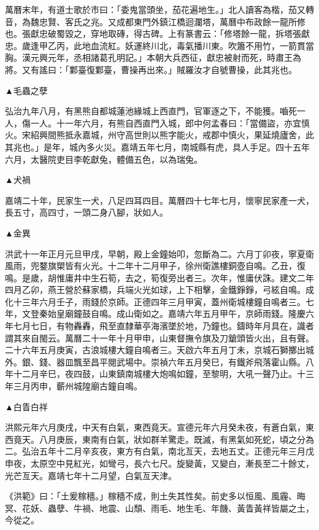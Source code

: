\begin{pinyinscope}
萬曆末年，有道士歌於市曰：「委鬼當頭坐，茄花遍地生。」北人讀客為楷，茄又轉音，為魏忠賢、客氏之兆。又成都東門外鎮江橋迴瀾塔，萬曆中布政餘一龍所修也。張獻忠破蜀毀之，穿地取磚，得古碑。上有篆書云：「修塔餘一龍，拆塔張獻忠。歲逢甲乙丙，此地血流紅。妖運終川北，毒氣播川東。吹簫不用竹，一箭貫當胸。漢元興元年，丞相諸葛孔明記。」本朝大兵西征，獻忠被射而死，時肅王為將。又有謠曰：「鄴臺復鄴臺，曹操再出來。」賊羅汝才自號曹操，此其兆也。

▲毛蟲之孽

弘治九年八月，有黑熊自都城蓮池緣城上西直門，官軍逐之下，不能獲。嚙死一人，傷一人。十一年六月，有熊自西直門入城，郎中何孟春曰：「當備盜，亦宜慎火。宋紹興間熊抵永嘉城，州守高世則以熊字能火，戒郡中慎火，果延燒廬舍，此其兆也。」是年，城內多火災。嘉靖五年七月，南城縣有虎，具人手足。四十五年六月，太醫院吏目李乾獻兔，體備五色，以為瑞兔。

▲犬禍

嘉靖二十年，民家生一犬，八足四耳四目。萬曆四十七年七月，懷寧民家產一犬，長五寸，高四寸，一頭二身八腳，狀如人。

▲金異

洪武十一年正月元旦甲戌，早朝，殿上金鐘始叩，忽斷為二。六月丁卯夜，寧夏衛風雨，兜鍪旗槊皆有火光。十二年十二月甲子，徐州衛譙樓銅壺自鳴。乙丑，復鳴。是歲，胡惟庸井中生石筍，去之，筍復旁出者三。次年，惟庸伏誅。建文二年四月乙卯，燕王營於蘇家橋，兵端火光如球，上下相擊，金鐵錚錚，弓絃自鳴。成化十三年六月壬子，雨錢於京師。正德四年三月甲寅，蓋州衛城樓鐘自鳴者三。七年，文登秦始皇廟鐘鼓自鳴。成山衛如之。嘉靖六年五月甲午，京師雨錢。隆慶六年七月七日，有物轟轟，飛至直隸華亭海濱墜於地，乃鐘也。鑄時年月具在，識者謂其來自閩云。萬曆二十一年十月甲申，山東督撫令旗及刀鎗頭皆火出，且有聲。二十六年五月庚寅，古浪城樓大鐘自鳴者三。天啟六年五月丁未，京城石獅擲出城外。銀、錢、器皿飄至昌平閱武場中。崇禎六年五月癸巳，有鐵斧飛落霍山縣。八年十二月辛巳，夜四鼓，山東鎮南城樓大炮鳴如鐘，至黎明，大吼一聲乃止。十三年三月丙申，蘄州城隍廟古鐘自鳴。

▲白眚白祥

洪熙元年六月庚戌，中天有白氣，東西竟天。宣德元年六月癸未夜，有蒼白氣，東西竟天。八月庚辰，東南有白氣，狀如群羊驚走。既滅，有黑氣如死蛇，頃之分為二。弘治五年十二月辛亥夜，東方有白氣，南北亙天，去地五丈。正德元年三月戊申夜，太原空中見紅光，如彎弓，長六七尺。旋變黃，又變白，漸長至二十餘丈，光芒亙天。嘉靖七年十二月望，白氣亙天津。

《洪範》曰：「土爰稼穡。」稼穡不成，則土失其性矣。前史多以恒風、風霾、晦冥、花妖、蟲孽、牛禍、地震、山頹、雨毛、地生毛、年饑、黃眚黃祥皆屬之土，今從之。


\end{pinyinscope}
